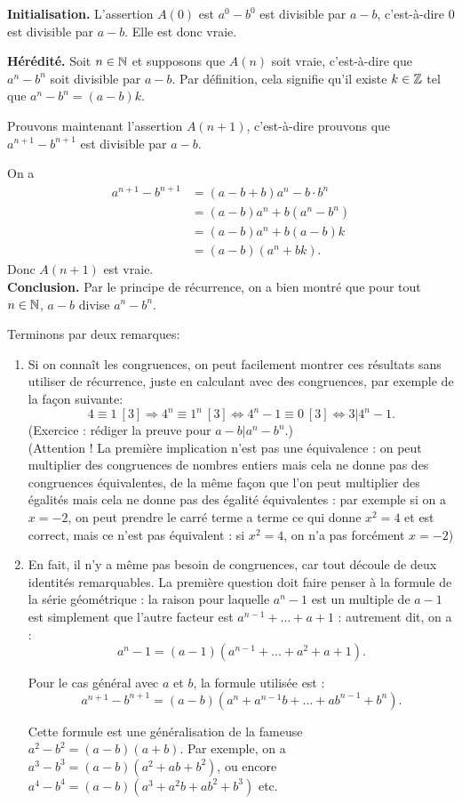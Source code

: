 \begin{exo}[Divisibilité]
\begin{sol}
\begin{enumerate}
\textbf{Initialisation.} L'assertion $A(0)$ est \og $a^0-b^0$ est divisible par $a-b$\fg, c'est-à-dire \og $0$ est divisible par $a-b$\fg. Elle est donc vraie.

\textbf{Hérédité.} Soit $n\in \mathbb N$ et supposons que $A(n)$ soit vraie, c'est-à-dire que $a^n-b^n$ soit divisible par $a-b$. Par définition, cela signifie qu'il existe $k\in\mathbb Z$ tel que $a^n-b^n=(a-b)k$.

Prouvons maintenant l'assertion $A(n+1)$, c'est-à-dire prouvons que $a^{n+1}-b^{n+1}$ est divisible par $a-b$.

On a 
\begin{align*}
a^{n+1}-b^{n+1} &= (a-b+b)a^n-b\cdot b^n\\
		  &= (a-b)a^n + b(a^n-b^n)\\
		  &= (a-b)a^n + b(a-b)k\\
		  &= (a-b)(a^n+bk).
\end{align*}
Donc $A(n+1)$ est vraie.\\
\textbf{Conclusion.} Par le principe de récurrence, on a bien montré que pour tout $n\in \mathbb N$, $a-b$ divise $a^{n}-b^{n}$.

\end{enumerate}

Terminons par deux remarques:
\begin{enumerate}
\item Si on connaît les congruences, on peut facilement montrer ces résultats sans utiliser de récurrence, juste en calculant avec des congruences, par exemple de la façon suivante:
\[
4\equiv 1 ~[3] 
\Rightarrow 4^n\equiv 1^n~[3]
\Leftrightarrow 4^n-1\equiv 0~[3] 
\Leftrightarrow 3 | 4^n-1.
\]
(Exercice : rédiger la preuve pour $a-b | a^n-b^n$.)\\
(Attention ! La première implication n'est pas une équivalence : on peut multiplier des congruences de nombres entiers mais cela ne donne pas des congruences équivalentes, de la même façon que l'on peut multiplier des égalités mais cela ne donne pas des égalité équivalentes : par exemple si on a $x=-2$, on peut prendre le carré terme a terme ce qui donne $x^2=4$ et est correct, mais ce n'est pas équivalent : si $x^2=4$, on n'a pas forcément $x=-2$)

\item En fait, il n'y a même pas besoin de congruences, car tout découle de deux identités remarquables. La première question doit faire penser à la formule de la série géométrique : la raison pour laquelle $a^n-1$ est un multiple de $a-1$ est simplement que l'autre facteur est $a^{n-1}+...+a+1$ : autrement dit, on a :
\[ a^n-1 = (a-1)(a^{n-1}+...+a^2+a+1).\]

Pour le cas général avec $a$ et $b$, la formule utilisée est : 
\[ a^{n+1}-b^{n+1} = (a-b)(a^n+a^{n-1}b+...+ab^{n-1}+b^n).\]

Cette formule est une généralisation de la fameuse $a^2-b^2=(a-b)(a+b)$. Par exemple, on a $a^3-b^3=(a-b)(a^2+ab+b^2)$, ou encore  $a^4-b^4=(a-b)(a^3+a^2b+ab^2+b^3)$ etc. 

\end{enumerate}
\end{sol}
\end{exo}

